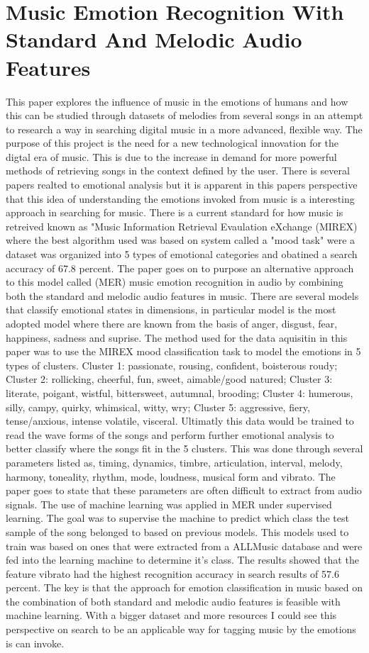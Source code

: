 \documentclass[12pt]{article} %
\begin{document}
\section{Music Emotion Recognition With Standard And Melodic Audio Features} %
This paper explores the influence of music in the emotions of humans and how this can be studied through datasets of melodies from several songs in an attempt to research a way in searching digital music in a more advanced, flexible way. The purpose of this project is the need for a new technological innovation for the digtal era of music. This is due to the increase in demand for more powerful methods of retrieving songs in the context defined by the user. There is several papers realted to emotional analysis but it is apparent in this papers perspective that this idea of understanding the emotions invoked from music is a interesting approach in searching for music. There is a current standard for how music is retreived known as "Music Information Retrieval Evaulation eXchange (MIREX) where the best algorithm used was based on system called a "mood task" were a dataset was organized into 5 types of emotional categories and obatined a search accuracy of 67.8 percent. The paper goes on to purpose an alternative approach to this model called (MER) music emotion recognition in audio by combining both the standard and melodic audio features in music. There are several models that classify emotional states in dimensions, in particular \cite{Russell} model is the most adopted model where there are known from the basis of anger, disgust, fear, happiness, sadness and suprise. The method used for the data aquisitin in this paper was to use the MIREX mood classification task to model the emotions in 5 types of clusters. Cluster 1: passionate, rousing, confident, boisterous roudy; Cluster 2: rollicking, cheerful, fun, sweet, aimable/good natured; Cluster 3: literate, poigant, wistful, bittersweet, autumnal, brooding; Cluster 4: humerous, silly, campy, quirky, whimsical, witty, wry; Cluster 5: aggressive, fiery, tense/anxious, intense volatile, visceral. Ultimatly this data would be trained to read the wave forms of the songs and perform further emotional analysis to better classify where the songs fit in the 5 clusters. This was done through several parameters listed as, timing, dynamics, timbre, articulation, interval, melody, harmony, toneality, rhythm, mode, loudness, musical form and vibrato. The paper goes to state that these parameters are often difficult to extract from audio signals. The use of machine learning was applied in MER under supervised learning. The goal was to supervise the machine to predict which class the test sample of the song belonged to based on previous models. This models used to train was based on ones that were extracted from a ALLMusic database and were fed into the learning machine to determine it's class. The results showed that the feature vibrato had the highest recognition accuracy in search results of 57.6 percent. The key is that the approach for emotion classification in music based on the combination of both standard and melodic audio features is feasible with machine learning. With a bigger dataset and more resources I could see this perspective on search to be an applicable way for tagging music by the emotions is can invoke.
\end{document}
